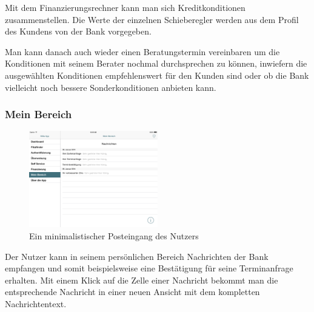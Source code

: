 	Mit dem Finanzierungsrechner kann man sich Kreditkonditionen zusammenstellen. Die Werte der einzelnen Schieberegler werden aus dem Profil des Kundens von der Bank vorgegeben.

	Man kann danach auch wieder einen Beratungstermin vereinbaren um die Konditionen mit seinem Berater nochmal durchsprechen zu können, inwiefern die ausgewählten Konditionen empfehlenswert für den Kunden sind oder ob die Bank vielleicht noch bessere Sonderkonditionen anbieten kann.

\subsubsection{Mein Bereich}

\begin{figure}[h]
	\centering
  \includegraphics[width=0.5\textwidth]{Pictures/mbereichneu}
	\caption{Ein minimalistischer Posteingang des Nutzers\label{fig10}}
\end{figure}

	Der Nutzer kann in seinem persönlichen Bereich Nachrichten der Bank empfangen und somit beispielsweise eine Bestätigung für seine Terminanfrage erhalten. Mit einem Klick auf die Zelle einer Nachricht bekommt man die entsprechende Nachricht in einer neuen Ansicht mit dem kompletten Nachrichtentext.
\pagebreak
